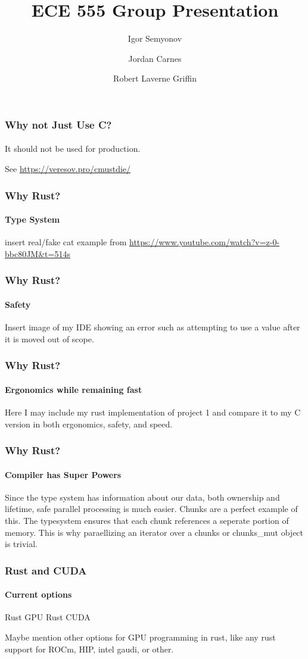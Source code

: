 \documentclass[aspectratio=169]{beamer}
\title[Short Title]{
    ECE 555 Group Presentation
}
\author{
	Igor Semyonov
	\and Jordan Carnes
	\and Robert Laverne Griffin
}
\institute{
    George Macon University, Department of Electrical and Computer Engineering
}
\begin{document}
\begin{frame}
	\vspace{-1.8cm}
	\titlepage
\end{frame}

\begin{frame}
	\frametitle{Why not Just Use C?}
	\framesubtitle{}

	It should not be used for production.

	See \url{https://veresov.pro/cmustdie/}
\end{frame}

\begin{frame}
	\frametitle{Why Rust?}
	\framesubtitle{Type System}

	insert real/fake cat example from \url{https://www.youtube.com/watch?v=z-0-bbc80JM&t=514s}
\end{frame}

\begin{frame}
	\frametitle{Why Rust?}
	\framesubtitle{Safety}

	Insert image of my IDE showing an error such as attempting to use a value after it is moved out of scope.
\end{frame}

\begin{frame}
	\frametitle{Why Rust?}
	\framesubtitle{Ergonomics while remaining fast}

	Here I may include my rust implementation of project 1 and compare it to my C version in both ergonomics, safety, and speed.
\end{frame}

\begin{frame}
	\frametitle{Why Rust?}
	\framesubtitle{Compiler has Super Powers}

	Since the type system has information about our data, both ownership and lifetime, safe parallel processing is much easier. Chunks are a perfect example of this. The typesystem ensures that each chunk references a seperate portion of memory. This is why paraellizing an iterator over a chunks or chunks\_mut object is trivial.
\end{frame}

\begin{frame}
	\frametitle{Rust and CUDA}
	\framesubtitle{Current options}

	\begin{outline}[itemize]
		\1 Rust GPU
		\1 Rust CUDA
	\end{outline}

	Maybe mention other options for GPU programming in rust, like any rust support for ROCm, HIP, intel gaudi, or other.
\end{frame}
\end{document}
